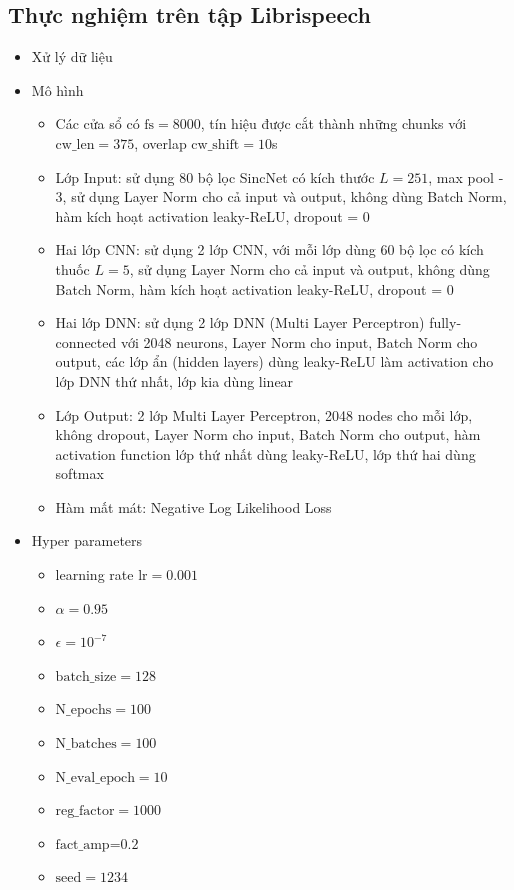 \documentclass{article}
\begin{document}
	\subsection{Thực nghiệm trên tập Librispeech}
	\begin{itemize}
		\item Xử lý dữ liệu
		\item Mô hình 
		\begin{itemize}
			\item Các cửa sổ có $\text{fs} = 8000$, tín hiệu được cắt thành những chunks với $\text{cw\_len}=375$, overlap $\text{cw\_shift}=10$s
			\item Lớp Input: sử dụng 80 bộ lọc SincNet có kích thước $L=251$, max pool - 3, sử dụng Layer Norm cho cả input và output, không dùng Batch Norm, hàm kích hoạt activation leaky-ReLU, dropout = 0
			\item Hai lớp CNN: sử dụng 2 lớp CNN, với mỗi lớp dùng 60 bộ lọc có kích thuốc $L=5$, sử dụng Layer Norm cho cả input và output, không dùng Batch Norm, hàm kích hoạt activation leaky-ReLU, dropout = 0
			\item Hai lớp DNN: sử dụng 2 lớp DNN (Multi Layer Perceptron) fully-connected với 2048 neurons, Layer Norm cho input, Batch Norm cho output, các lớp ẩn (hidden layers) dùng leaky-ReLU làm activation cho lớp DNN thứ nhất, lớp kia dùng linear
			\item Lớp Output: 2 lớp Multi Layer Perceptron, 2048 nodes cho mỗi lớp, không dropout, Layer Norm cho input, Batch Norm cho output, hàm activation function lớp thứ nhất dùng leaky-ReLU, lớp thứ hai dùng softmax
			\item Hàm mất mát: Negative Log Likelihood Loss
		\end{itemize}
		\item Hyper parameters
		\begin{itemize}
			\item learning rate $\text{lr} = 0.001$
			\item $\alpha = 0.95$
			\item $\epsilon = 10^{-7}$
			\item $\text{batch\_size}=128$
			\item $\text{N\_epochs}=100$
			\item $\text{N\_batches}=100$
			\item $\text{N\_eval\_epoch}=10$
			\item $\text{reg\_factor}=1000$
			\item $\text{fact\_amp=0.2}$
			\item $\text{seed}=1234$
		\end{itemize}
	\end{itemize}
\end{document}
